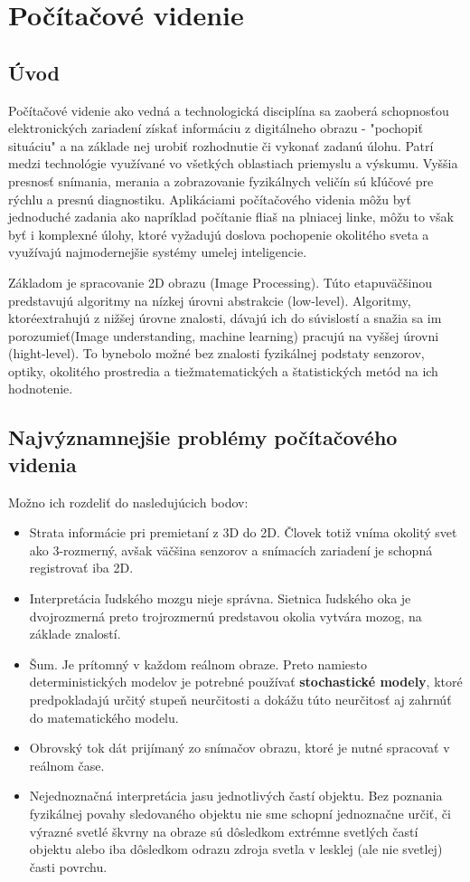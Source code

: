 \chapter{Počítačové videnie}
\section{Úvod}

Počítačové videnie ako vedná a technologická disciplína sa zaoberá schopnosťou elektronických zariadení získať informáciu z digitálneho obrazu - "pochopiť situáciu" a na základe nej urobiť rozhodnutie či vykonať zadanú úlohu.  Patrí medzi technológie využívané vo všetkých oblastiach priemyslu a výskumu. Vyššia presnosť snímania, merania a zobrazovanie  fyzikálnych veličín sú kľúčové pre rýchlu a presnú diagnostiku. Aplikáciami počítačového videnia môžu byť jednoduché zadania ako napríklad počítanie fliaš na plniacej linke, môžu to však byť i komplexné úlohy, ktoré vyžadujú doslova pochopenie okolitého sveta a využívajú najmodernejšie systémy umelej inteligencie.

Základom je spracovanie 2D obrazu (Image Processing). Túto etapuväčšinou predstavujú algoritmy na nízkej úrovni abstrakcie (low-level). Algoritmy, ktoréextrahujú z nižšej úrovne znalosti, dávajú ich do súvislostí a snažia sa im porozumieť(Image understanding, machine learning) pracujú na vyššej úrovni (hight-level). To bynebolo možné bez znalosti fyzikálnej podstaty senzorov, optiky, okolitého prostredia a tiežmatematických a štatistických metód na ich hodnotenie\cite{pocitacove_videnie_v_praxi}. 

\vspace{4mm}
\section{Najvýznamnejšie problémy počítačového videnia }
Možno ich rozdeliť do nasledujúcich bodov\cite{Analysis_and_Machine_Vision}:
\begin{itemize}
\item Strata informácie pri premietaní z 3D do 2D. Človek totiž vníma okolitý svet ako 3-rozmerný, avšak väčšina senzorov a snímacích zariadení je schopná registrovať iba 2D.
\item Interpretácia ľudského mozgu nieje správna. Sietnica ľudského oka je dvojrozmerná preto trojrozmernú predstavou okolia vytvára mozog, na základe znalostí.
\item Šum. Je prítomný v každom reálnom obraze. Preto namiesto deterministických modelov je potrebné používať \textbf{stochastické modely}, ktoré predpokladajú určitý stupeň neurčitosti a dokážu túto neurčitosť aj zahrnúť do matematického modelu.
\item Obrovský tok dát prijímaný zo snímačov obrazu, ktoré je nutné spracovať v reálnom čase.
\item Nejednoznačná interpretácia jasu jednotlivých častí objektu. Bez poznania fyzikálnej povahy sledovaného objektu nie sme schopní jednoznačne určiť, či výrazné svetlé škvrny na obraze sú dôsledkom extrémne svetlých častí objektu alebo iba dôsledkom odrazu zdroja svetla v lesklej (ale nie svetlej) časti povrchu.
\end{itemize}


